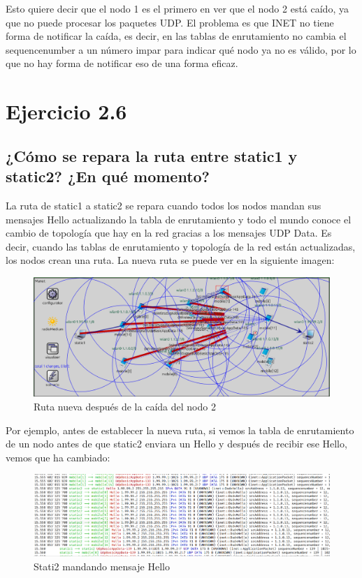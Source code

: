 Esto quiere decir que el nodo 1 es el primero en ver que el nodo 2 está caído, ya que no puede procesar los paquetes UDP. El problema es que INET no tiene forma de notificar la caída, es decir, en las tablas de enrutamiento no cambia el sequencenumber a un número impar para indicar qué nodo ya no es válido, por lo que no hay forma de notificar eso de una forma eficaz.



\section{Ejercicio 2.6}

\subsection{¿Cómo se repara la ruta entre static1 y static2? ¿En qué momento?}

La ruta de static1 a static2 se repara cuando todos los nodos mandan sus mensajes Hello actualizando la tabla de enrutamiento y todo el mundo conoce el cambio de topología que hay en la red gracias a los mensajes UDP Data. Es decir, cuando las tablas de enrutamiento y topología de la red están actualizadas, los nodos crean una ruta. La nueva ruta se puede ver en la siguiente imagen:

\begin{figure}[H]
    \centering
    \includegraphics[width=115mm, scale=0.75]{imaxes/dsdv/ejercicio2_6.png}
    \caption{Ruta nueva después de la caída del nodo 2}
    \label{fig:ejer2_6}
\end{figure}

Por ejemplo, antes de establecer la nueva ruta, si vemos la tabla de enrutamiento de un nodo antes de que static2 enviara un Hello y después de recibir ese Hello, vemos que ha cambiado:

\begin{figure}[H]
    \centering
    \includegraphics[width=145mm, scale=0.75]{imaxes/dsdv/ejercicio2_6_1.png}
    \caption{Stati2 mandando mensaje Hello}
    \label{fig:ejer2_6_1}
\end{figure}

